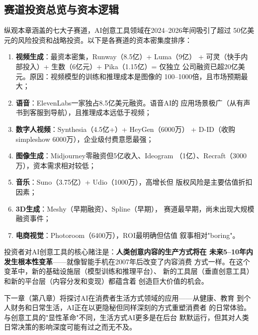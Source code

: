 \bigskip

\subsection{赛道投资总览与资本逻辑}
\label{subsec:create-investment}

纵观本章涵盖的七大子赛道，AI创意工具领域在2024--2026年间吸引了超过
50亿美元的风险投资和战略投资。以下是各赛道的资本密集度排序：

\begin{enumerate}[leftmargin=2em]
  \item \textbf{视频生成}：最资本密集，Runway（8.5亿）+ Luma（9亿）
    + 可灵（快手内部投入）+ 生数（6亿元）+ Pika（1.15亿）= 仅独立
    公司融资已超20亿美元。原因：视频模型的训练和推理成本是图像的
    100--1000倍，且市场预期最大；
  \item \textbf{语音}：ElevenLabs一家独占8.5亿美元融资。语音AI的
    应用场景极广（从有声书到客服到导航），且推理成本远低于视频；
  \item \textbf{数字人视频}：Synthesia（4.5亿+）+ HeyGen（6000万）
    + D-ID（收购simpleshow 6000万），企业级付费意愿最强；
  \item \textbf{图像生成}：Midjourney零融资但5亿收入、Ideogram
    （1亿）、Recraft（3000万），资本需求相对较低；
  \item \textbf{音乐}：Suno（3.75亿）+ Udio（1000万），高增长但
    版权风险是主要估值折扣因素；
  \item \textbf{3D生成}：Meshy（早期融资）、Spline（早期），
    赛道最早期，尚未出现大规模融资事件；
  \item \textbf{电商视觉}：Photoroom（6400万），ROI最明确但估值
    叙事相对"boring"。
\end{enumerate}

投资者对AI创意工具的核心赌注是：\textbf{人类创意内容的生产方式将在
未来5--10年内发生根本性变革}——就像智能手机在2007年后改变了内容消费
方式一样。在这个变革中，新的基础设施层（模型训练和推理平台）、
新的工具层（垂直创意工具）和新的平台层（内容分发和变现）都蕴含着
创造巨大价值的机会。

下一章（第八章）将探讨AI在消费者生活方式领域的应用——从健康、教育
到个人财务和日常生活，AI正在以更隐秘但同样深刻的方式重塑消费者
的日常体验。与创意工具的"显性革命"不同，生活方式AI更多是在后台
默默运行，但其对人类日常决策的影响深度可能有过之而无不及。
